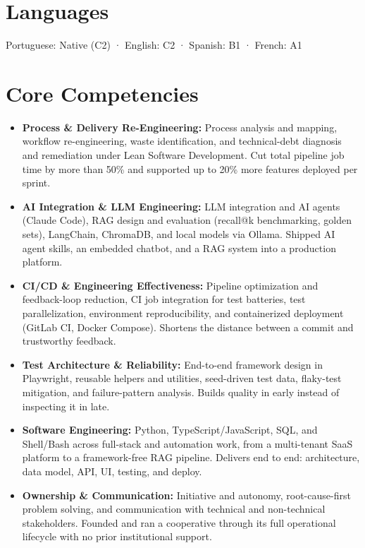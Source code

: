 \documentclass[10pt,a4paper]{article}
\newcommand{\cvcomp}[2]{\item {\bfseries #1:} #2}
\begin{document}
\section{Languages}

Portuguese: Native (C2) · English: C2 · Spanish: B1 · French: A1

\newpage


\section{Core Competencies}

\begin{itemize}
\cvcomp{Process \& Delivery Re-Engineering}{Process analysis and mapping, workflow re-engineering, waste identification, and technical-debt diagnosis and remediation under Lean Software Development. Cut total pipeline job time by more than 50\% and supported up to 20\% more features deployed per sprint.}
\cvcomp{AI Integration \& LLM Engineering}{LLM integration and AI agents (Claude Code), RAG design and evaluation (recall@k benchmarking, golden sets), LangChain, ChromaDB, and local models via Ollama. Shipped AI agent skills, an embedded chatbot, and a RAG system into a production platform.}
\cvcomp{CI/CD \& Engineering Effectiveness}{Pipeline optimization and feedback-loop reduction, CI job integration for test batteries, test parallelization, environment reproducibility, and containerized deployment (GitLab CI, Docker Compose). Shortens the distance between a commit and trustworthy feedback.}
\cvcomp{Test Architecture \& Reliability}{End-to-end framework design in Playwright, reusable helpers and utilities, seed-driven test data, flaky-test mitigation, and failure-pattern analysis. Builds quality in early instead of inspecting it in late.}
\cvcomp{Software Engineering}{Python, TypeScript/JavaScript, SQL, and Shell/Bash across full-stack and automation work, from a multi-tenant SaaS platform to a framework-free RAG pipeline. Delivers end to end: architecture, data model, API, UI, testing, and deploy.}
\cvcomp{Ownership \& Communication}{Initiative and autonomy, root-cause-first problem solving, and communication with technical and non-technical stakeholders. Founded and ran a cooperative through its full operational lifecycle with no prior institutional support.}
\end{itemize}
\end{document}
